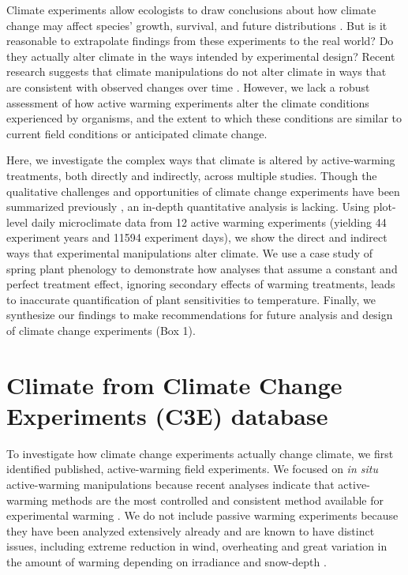 \documentclass{article}
\begin{document}
\par Climate experiments allow ecologists to draw conclusions about how climate change may affect species' growth, survival, and future distributions \citep{dukes1999,hobbie1999,morin2010,chuine2012,reich2015,gruner2017}. But is it reasonable to extrapolate findings from these experiments to the real world? Do they actually alter climate in the ways intended by experimental design? Recent research suggests that climate manipulations do not alter climate in ways that are consistent with observed changes over time \citep{wolkovich2012,menke2014}. However, we lack a robust assessment of how active warming experiments alter the climate conditions experienced by organisms, and the extent to which these conditions are similar to current field conditions or anticipated climate change. 

\par %
Here, we investigate the complex ways that climate is altered by active-warming treatments, both directly and indirectly, across multiple studies. Though the qualitative challenges and opportunities of climate change experiments have been summarized previously \citep[e.g.,][]{deboeck2015}, an in-depth quantitative analysis is lacking. Using plot-level daily microclimate data from 12 active warming experiments (yielding 44 experiment years and 11594 experiment days), we show the direct and indirect ways that experimental manipulations alter climate. We use a case study of spring plant phenology to demonstrate how analyses that assume a constant and perfect treatment effect, ignoring secondary effects of warming treatments, leads to inaccurate quantification of plant sensitivities to temperature. Finally, we synthesize our findings to make recommendations for future analysis and design of climate change experiments (Box 1). 

\section* {Climate from Climate Change Experiments (C3E) database}
\par To investigate how climate change experiments actually change climate, we first identified published, active-warming field experiments. We focused on \textit{in situ} active-warming manipulations because recent analyses indicate that active-warming methods are the most controlled and consistent method available for experimental warming \citep{kimball2005,kimball2008,aronson2009,wolkovich2012}. We do not include passive warming experiments because they have been analyzed extensively already and are known to have distinct issues, including extreme reduction in wind, overheating and great variation in the amount of warming depending on irradiance and snow-depth \citep{marion1997,shaver2000,wolkovich2012,bokhorst2013}.
\end{document}
